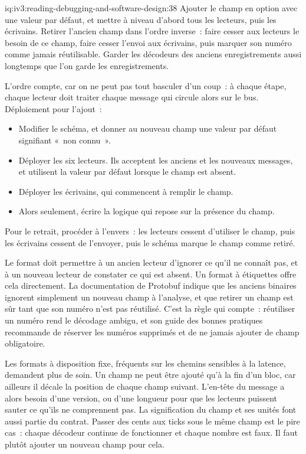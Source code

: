 \begin{solution}{iq:iv3:reading-debugging-and-software-design:38}
Ajouter le champ en option avec une valeur par défaut, et mettre à niveau d'abord tous les lecteurs, puis les écrivains. Retirer l'ancien champ dans l'ordre inverse~: faire cesser aux lecteurs le besoin de ce champ, faire cesser l'envoi aux écrivains, puis marquer son numéro comme jamais réutilisable. Garder les décodeurs des anciens enregistrements aussi longtemps que l'on garde les enregistrements.

L'ordre compte, car on ne peut pas tout basculer d'un coup~: à chaque étape, chaque lecteur doit traiter chaque message qui circule alors sur le bus. Déploiement pour l'ajout~:
\begin{itemize}
\item Modifier le schéma, et donner au nouveau champ une valeur par défaut signifiant «~non connu~».
\item Déployer les six lecteurs. Ils acceptent les anciens et les nouveaux messages, et utilisent la valeur par défaut lorsque le champ est absent.
\item Déployer les écrivains, qui commencent à remplir le champ.
\item Alors seulement, écrire la logique qui repose sur la présence du champ.
\end{itemize}
Pour le retrait, procéder à l'envers~: les lecteurs cessent d'utiliser le champ, puis les écrivains cessent de l'envoyer, puis le schéma marque le champ comme retiré.

Le format doit permettre à un ancien lecteur d'ignorer ce qu'il ne connaît pas, et à un nouveau lecteur de constater ce qui est absent. Un format à étiquettes offre cela directement. La documentation de Protobuf indique que les anciens binaires ignorent simplement un nouveau champ à l'analyse, et que retirer un champ est sûr tant que son numéro n'est pas réutilisé. C'est la règle qui compte~: réutiliser un numéro rend le décodage ambigu, et son guide des bonnes pratiques recommande de réserver les numéros supprimés et de ne jamais ajouter de champ obligatoire.

Les formats à disposition fixe, fréquents sur les chemins sensibles à la latence, demandent plus de soin. Un champ ne peut être ajouté qu'à la fin d'un bloc, car ailleurs il décale la position de chaque champ suivant. L'en-tête du message a alors besoin d'une version, ou d'une longueur pour que les lecteurs puissent sauter ce qu'ils ne comprennent pas. La signification du champ et ses unités font aussi partie du contrat. Passer des cents aux ticks sous le même champ est le pire cas~: chaque décodeur continue de fonctionner et chaque nombre est faux. Il faut plutôt ajouter un nouveau champ pour cela.


\end{solution}
